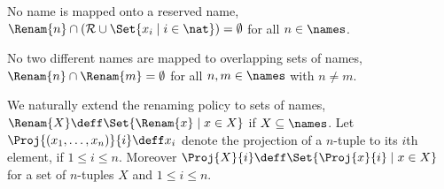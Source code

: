\documentclass[]{eptcs}
\begin{document}
\begin{compactenum}
	\item No name is mapped onto a reserved name, \ie $ \Renam{n} \cap \left( \mathcal{R} \cup \Set{ x_i \mid i \in \nat } \right) = \emptyset $ for all $ n \in \names $.
	\item No two different names are mapped to overlapping sets of names, \ie $ \Renam{n} \cap \Renam{m} = \emptyset $ for all $ n, m \in \names $ with $ n \neq m $.
\end{compactenum}
We naturally extend the renaming policy to sets of names, \ie $ \Renam{X} \deff \Set{ \Renam{x} \mid x \in X } $ if $ X \subseteq \names $.
Let $ \Proj{\left( x_1, \ldots, x_n \right)}{i} \deff x_i $ denote the projection of a $ n $-tuple to its $ i $th element, if $ 1 \leq i \leq n $. Moreover $ \Proj{X}{i} \deff \Set{ \Proj{x}{i} \mid x \in X } $ for a set of $ n $-tuples $ X $ and $ 1 \leq i \leq n $.
\end{document}
